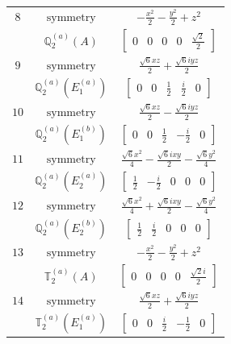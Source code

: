 \documentclass[fleqn,8pt,landscape]{jsarticle}
\begin{document}
\begin{longtable}{ccc}
$ 8 $ & $ \text{symmetry} $ & $ - \frac{x^{2}}{2} - \frac{y^{2}}{2} + z^{2} $ \\
$  $ & $ \mathbb{Q}_{2}^{(a)}(A) $ & $ \begin{bmatrix} 0 & 0 & 0 & 0 & \frac{\sqrt{2}}{2} \end{bmatrix} $ \\ \hline
$ 9 $ & $ \text{symmetry} $ & $ \frac{\sqrt{6} x z}{2} + \frac{\sqrt{6} i y z}{2} $ \\
$  $ & $ \mathbb{Q}_{2}^{(a)}(E_{1}^{(a)}) $ & $ \begin{bmatrix} 0 & 0 & \frac{1}{2} & \frac{i}{2} & 0 \end{bmatrix} $ \\ \hline
$ 10 $ & $ \text{symmetry} $ & $ \frac{\sqrt{6} x z}{2} - \frac{\sqrt{6} i y z}{2} $ \\
$  $ & $ \mathbb{Q}_{2}^{(a)}(E_{1}^{(b)}) $ & $ \begin{bmatrix} 0 & 0 & \frac{1}{2} & - \frac{i}{2} & 0 \end{bmatrix} $ \\ \hline
$ 11 $ & $ \text{symmetry} $ & $ \frac{\sqrt{6} x^{2}}{4} - \frac{\sqrt{6} i x y}{2} - \frac{\sqrt{6} y^{2}}{4} $ \\
$  $ & $ \mathbb{Q}_{2}^{(a)}(E_{2}^{(a)}) $ & $ \begin{bmatrix} \frac{1}{2} & - \frac{i}{2} & 0 & 0 & 0 \end{bmatrix} $ \\ \hline
$ 12 $ & $ \text{symmetry} $ & $ \frac{\sqrt{6} x^{2}}{4} + \frac{\sqrt{6} i x y}{2} - \frac{\sqrt{6} y^{2}}{4} $ \\
$  $ & $ \mathbb{Q}_{2}^{(a)}(E_{2}^{(b)}) $ & $ \begin{bmatrix} \frac{1}{2} & \frac{i}{2} & 0 & 0 & 0 \end{bmatrix} $ \\ \hline
$ 13 $ & $ \text{symmetry} $ & $ - \frac{x^{2}}{2} - \frac{y^{2}}{2} + z^{2} $ \\
$  $ & $ \mathbb{T}_{2}^{(a)}(A) $ & $ \begin{bmatrix} 0 & 0 & 0 & 0 & \frac{\sqrt{2} i}{2} \end{bmatrix} $ \\ \hline
$ 14 $ & $ \text{symmetry} $ & $ \frac{\sqrt{6} x z}{2} + \frac{\sqrt{6} i y z}{2} $ \\
$  $ & $ \mathbb{T}_{2}^{(a)}(E_{1}^{(a)}) $ & $ \begin{bmatrix} 0 & 0 & \frac{i}{2} & - \frac{1}{2} & 0 \end{bmatrix} $ \\ \hline

\end{longtable}
\end{document}
